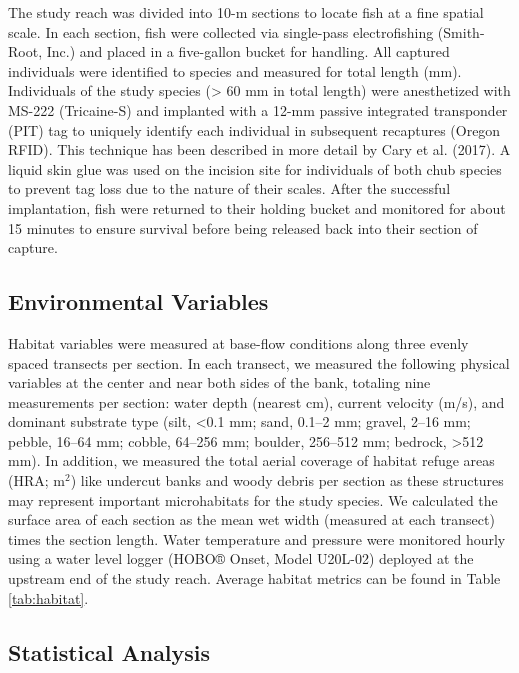 \documentclass[11pt, class=article, crop=false]{standalone}
\begin{document}
The study reach was divided into 10-m sections to locate fish at a fine spatial scale. In each section, fish were collected via single-pass electrofishing (Smith-Root, Inc.) and placed in a five-gallon bucket for handling. All captured individuals were identified to species and measured for total length (mm). Individuals of the study species (> 60 mm in total length) were anesthetized with MS-222 (Tricaine-S) and implanted with a 12-mm passive integrated transponder (PIT) tag to uniquely identify each individual in subsequent recaptures (Oregon RFID). This technique has been described in more detail by Cary et al. (2017). A liquid skin glue was used on the incision site for individuals of both chub species to prevent tag loss due to the nature of their scales. After the successful implantation, fish were returned to their holding bucket and monitored for about 15 minutes to ensure survival before being released back into their section of capture. 

\subsection{Environmental Variables}

Habitat variables were measured at base-flow conditions along three evenly spaced transects per section. In each transect, we measured the following physical variables at the center and near both sides of the bank, totaling nine measurements per section: water depth (nearest cm), current velocity (m/s), and dominant substrate type (silt, <0.1 mm; sand, 0.1--2 mm; gravel, 2--16 mm; pebble, 16--64 mm; cobble, 64--256 mm; boulder, 256--512 mm; bedrock, >512 mm). In addition, we measured the total aerial coverage of habitat refuge areas (HRA; m$^2$) like undercut banks and woody debris per section as these structures may represent important microhabitats for the study species. We calculated the surface area of each section as the mean wet width (measured at each transect) times the section length. Water temperature and pressure were monitored hourly using a water level logger (HOBO® Onset, Model U20L-02) deployed at the upstream end of the study reach. Average habitat metrics can be found in Table \ref{tab:habitat}.



\subsection{Statistical Analysis}
\end{document}
